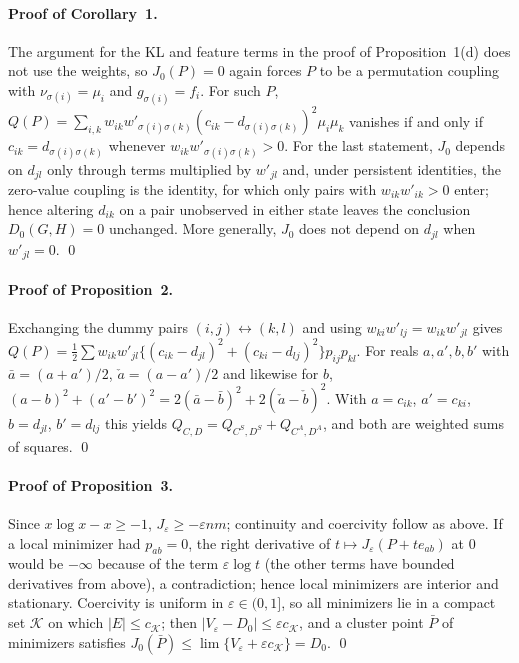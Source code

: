 \documentclass[12pt]{article}
\begin{document}
\paragraph{Proof of Corollary~1.}
The argument for the KL and feature terms in the proof of Proposition~1(d) does not use the weights, so $J_0(P)=0$ again forces $P$ to be a permutation coupling with $\nu_{\sigma(i)}=\mu_i$ and $g_{\sigma(i)}=f_i$. For such $P$, $Q(P)=\sum_{i,k}w_{ik}w'_{\sigma(i)\sigma(k)}(c_{ik}-d_{\sigma(i)\sigma(k)})^2\mu_i\mu_k$ vanishes if and only if $c_{ik}=d_{\sigma(i)\sigma(k)}$ whenever $w_{ik}w'_{\sigma(i)\sigma(k)}>0$. For the last statement, $J_0$ depends on $d_{jl}$ only through terms multiplied by $w'_{jl}$ and, under persistent identities, the zero-value coupling is the identity, for which only pairs with $w_{ik}w'_{ik}>0$ enter; hence altering $d_{ik}$ on a pair unobserved in either state leaves the conclusion $D_0(G,H)=0$ unchanged. More generally, $J_0$ does not depend on $d_{jl}$ when $w'_{jl}=0$. \qed

\paragraph{Proof of Proposition~2.}
Exchanging the dummy pairs $(i,j)\leftrightarrow(k,l)$ and using $w_{ki}w'_{lj}=w_{ik}w'_{jl}$ gives $Q(P)=\frac12\sum w_{ik}w'_{jl}\{(c_{ik}-d_{jl})^2+(c_{ki}-d_{lj})^2\}p_{ij}p_{kl}$. For reals $a,a',b,b'$ with $\bar a=(a+a')/2$, $\check a=(a-a')/2$ and likewise for $b$, $(a-b)^2+(a'-b')^2=2(\bar a-\bar b)^2+2(\check a-\check b)^2$. With $a=c_{ik}$, $a'=c_{ki}$, $b=d_{jl}$, $b'=d_{lj}$ this yields $Q_{C,D}=Q_{C^S,D^S}+Q_{C^A,D^A}$, and both are weighted sums of squares. \qed

\paragraph{Proof of Proposition~3.}
Since $x\log x-x\ge-1$, $J_\varepsilon\ge-\varepsilon nm$; continuity and coercivity follow as above. If a local minimizer had $p_{ab}=0$, the right derivative of $t\mapsto J_\varepsilon(P+te_{ab})$ at $0$ would be $-\infty$ because of the term $\varepsilon\log t$ (the other terms have bounded derivatives from above), a contradiction; hence local minimizers are interior and stationary. Coercivity is uniform in $\varepsilon\in(0,1]$, so all minimizers lie in a compact set $\mathcal K$ on which $|E|\le c_{\mathcal K}$; then $|V_\varepsilon-D_0|\le\varepsilon c_{\mathcal K}$, and a cluster point $\bar P$ of minimizers satisfies $J_0(\bar P)\le\lim\{V_\varepsilon+\varepsilon c_{\mathcal K}\}=D_0$. \qed
\end{document}
